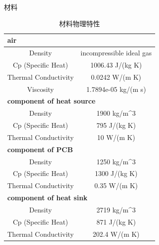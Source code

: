\documentclass[UTF8,9pt]{ctexbeamer}
\begin{document}
\begin{frame}{材料}
	\begin{table}[]
		\begin{tabular}{|cc|}
		\hline
		\multicolumn{2}{|l|}{\textbf{air}}                                        \\ \hline
		\multicolumn{1}{|c|}{Density}              & incompressible ideal gas     \\ \hline
		\multicolumn{1}{|c|}{Cp (Specific Heat)}   & 1006.43 J/(kg K)             \\ \hline
		\multicolumn{1}{|c|}{Thermal Conductivity} & 0.0242 W/(m K)               \\ \hline
		\multicolumn{1}{|c|}{Viscosity}            & 1.7894e-05 kg/(m s)          \\ \hline
		\multicolumn{2}{|l|}{\textbf{component of heat source}}                   \\ \hline
		\multicolumn{1}{|c|}{Density}              & 1900 kg/m\textasciicircum{}3 \\ \hline
		\multicolumn{1}{|c|}{Cp (Specific Heat)}   & 795 J/(kg K)                 \\ \hline
		\multicolumn{1}{|c|}{Thermal Conductivity} & 10 W/(m K)                   \\ \hline
		\multicolumn{2}{|l|}{\textbf{component of PCB}}                           \\ \hline
		\multicolumn{1}{|c|}{Density}              & 1250 kg/m\textasciicircum{}3 \\ \hline
		\multicolumn{1}{|c|}{Cp (Specific Heat)}   & 1300 J/(kg K)                \\ \hline
		\multicolumn{1}{|c|}{Thermal Conductivity} & 0.35 W/(m K)                 \\ \hline
		\multicolumn{2}{|l|}{\textbf{component of heat sink}}                     \\ \hline
		\multicolumn{1}{|c|}{Density}              & 2719 kg/m\textasciicircum{}3 \\ \hline
		\multicolumn{1}{|c|}{Cp (Specific Heat)}   & 871 J/(kg K)                 \\ \hline
		\multicolumn{1}{|c|}{Thermal Conductivity} & 202.4 W/(m K)                \\ \hline
		\end{tabular}
		\caption[]{材料物理特性}
		\end{table}
\end{frame}
\end{document}
